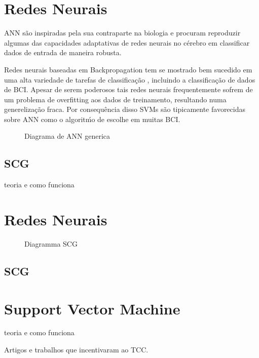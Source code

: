 \section{Redes Neurais}
\par
\ac{ANN} s\~ao inspiradas pela sua contraparte na biologia e procuram reproduzir algumas das capacidades adaptativas de redes neurais no c\'erebro em classificar dados de entrada de maneira robusta.
\par
Redes neurais baseadas em Backpropagation tem se mostrado bem sucedido em uma alta variedade de tarefas de classifica\c{c}\~ao , incluindo a classifica\c{c}\~ao de dados de \ac{BCI}.
Apesar de serem poderosos tais redes neurais frequentemente sofrem de um problema de overfitting aos dados de treinamento, resultando numa genereliza\c{c}\~ao fraca.
Por consequ\^encia disso \ac{SVM}s s\~ao tipicamente favorecidas sobre \ac{ANN} como o algorit\'mo de escolhe em muitas \ac{BCI}. \cite{Rao}
\clearpage
\begin{figure}[!h]
	\begin{centering}
		
		\caption{Diagrama de ANN generica}
	\end{centering}	
\end{figure}
\subsection{SCG}
teoria e como funciona
\section{Redes Neurais}
\begin{figure}[!htp]
	\begin{centering}
		\caption{Diagramma SCG}
	\end{centering}	
\end{figure}
\subsection{SCG}
 \cite{MollerSCG}
\section{Support Vector Machine}

teoria e como funciona \cite{Vapnik95} \cite{SVM2017}




Artigos e trabalhos que incentivaram ao TCC.
